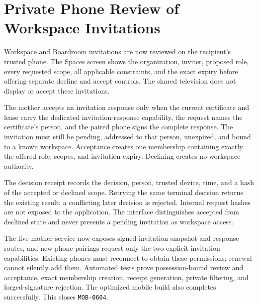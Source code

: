 \section{Private Phone Review of Workspace Invitations}
\label{sec:pilot-mobile-workspace-invitation-review}
\raggedright

Workspace and Boardroom invitations are now reviewed on the recipient's trusted phone.
The Spaces screen shows the organization, inviter, proposed role, every requested scope,
all applicable constraints, and the exact expiry before offering separate decline and
accept controls.  The shared television does not display or accept these invitations.

The mother accepts an invitation response only when the current certificate and lease
carry the dedicated invitation-response capability, the request names the certificate's
person, and the paired phone signs the complete response.  The invitation must still be
pending, addressed to that person, unexpired, and bound to a known workspace.  Acceptance
creates one membership containing exactly the offered role, scopes, and invitation
expiry.  Declining creates no workspace authority.

The decision receipt records the decision, person, trusted device, time, and a hash of
the accepted or declined scope.  Retrying the same terminal decision returns the existing
result; a conflicting later decision is rejected.  Internal request hashes are not
exposed to the application.  The interface distinguishes accepted from declined state
and never presents a pending invitation as workspace access.

The live mother service now exposes signed invitation snapshot and response routes, and
new phone pairings request only the two explicit invitation capabilities.  Existing
phones must reconnect to obtain these permissions; renewal cannot silently add them.
Automated tests prove possession-bound review and acceptance, exact membership creation,
receipt generation, private filtering, and forged-signature rejection.  The optimized
mobile build also completes successfully.  This closes \texttt{MOB-0604}.

